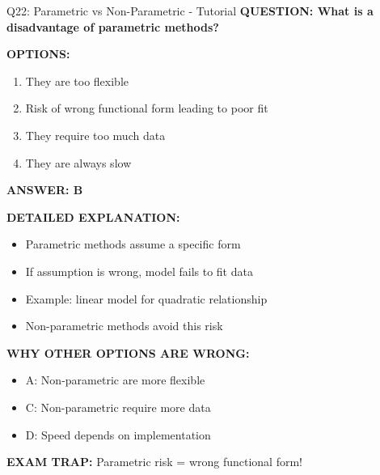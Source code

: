 \documentclass[8pt]{beamer}
\begin{document}
	\begin{frame}{Q22: Parametric vs Non-Parametric - Tutorial}
		\fontsize{6.5}{7.5}\selectfont
		\textbf{QUESTION: What is a disadvantage of parametric methods?}
		
		\vspace{0.1cm}
		\textbf{OPTIONS:}
		\begin{enumerate}
			\item They are too flexible
			\item Risk of wrong functional form leading to poor fit
			\item They require too much data
			\item They are always slow
		\end{enumerate}
		
		\vspace{0.1cm}
		\textcolor{myblue}{\textbf{ANSWER: B}}
		
		\vspace{0.1cm}
		\textbf{DETAILED EXPLANATION:}
		\begin{itemize}
			\item Parametric methods assume a specific form
			\item If assumption is wrong, model fails to fit data
			\item Example: linear model for quadratic relationship
			\item Non-parametric methods avoid this risk
		\end{itemize}
		
		\vspace{0.1cm}
		\textcolor{myred}{\textbf{WHY OTHER OPTIONS ARE WRONG:}}
		\begin{itemize}
			\item \textcolor{myred}{A:} Non-parametric are more flexible
			\item \textcolor{myred}{C:} Non-parametric require more data
			\item \textcolor{myred}{D:} Speed depends on implementation
		\end{itemize}
		
		\textcolor{myred}{\textbf{EXAM TRAP:}} Parametric risk = \textcolor{myblue}{wrong functional form}!
	\end{frame}
	
\end{document}
